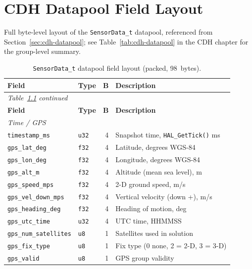\chapter{CDH Datapool Field Layout}
\label{app:cdh-datapool}

Full byte-level layout of the \texttt{SensorData\_t} datapool, referenced
from Section~\ref{sec:cdh-datapool}; see Table~\ref{tab:cdh-datapool} in
the CDH chapter for the group-level summary.

\begin{longtable}{@{}llr p{6.2cm}@{}}
\caption{\texttt{SensorData\_t} datapool field layout (packed, 98~bytes).}
\label{tab:cdh-fields}\\
\toprule
\textbf{Field} & \textbf{Type} & \textbf{B} & \textbf{Description} \\
\midrule
\endfirsthead
\multicolumn{4}{l}{\small\itshape Table~\ref{tab:cdh-fields} continued}\\
\toprule
\textbf{Field} & \textbf{Type} & \textbf{B} & \textbf{Description} \\
\midrule
\endhead
\multicolumn{4}{l}{\textit{Time / GPS}}\\
\texttt{timestamp\_ms}        & \texttt{u32}        & 4  & Snapshot time, \texttt{HAL\_GetTick()} ms \\
\texttt{gps\_lat\_deg}        & \texttt{f32}        & 4  & Latitude, degrees WGS-84 \\
\texttt{gps\_lon\_deg}        & \texttt{f32}        & 4  & Longitude, degrees WGS-84 \\
\texttt{gps\_alt\_m}          & \texttt{f32}        & 4  & Altitude (mean sea level), m \\
\texttt{gps\_speed\_mps}      & \texttt{f32}        & 4  & 2-D ground speed, m/s \\
\texttt{gps\_vel\_down\_mps}  & \texttt{f32}        & 4  & Vertical velocity (down +), m/s \\
\texttt{gps\_heading\_deg}    & \texttt{f32}        & 4  & Heading of motion, deg \\
\texttt{gps\_utc\_time}       & \texttt{u32}        & 4  & UTC time, HHMMSS \\
\texttt{gps\_num\_satellites} & \texttt{u8}         & 1  & Satellites used in solution \\
\texttt{gps\_fix\_type}       & \texttt{u8}         & 1  & Fix type (0 none, 2 = 2-D, 3 = 3-D) \\
\texttt{gps\_valid}           & \texttt{u8}         & 1  & GPS group validity \\

\end{longtable}
